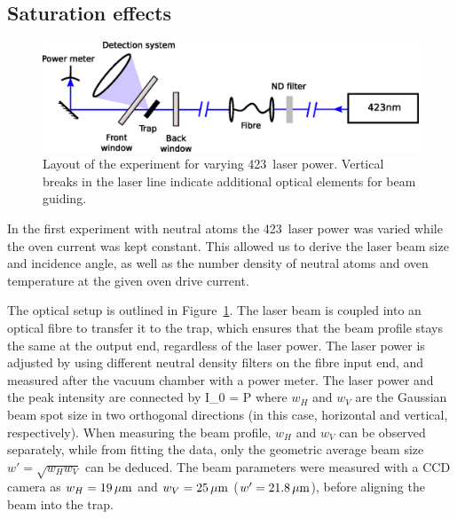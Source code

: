 \subsection{Saturation effects}
\label{subsec:saturationfluo}


\begin{figure}[t]
\centering
\includegraphics[angle=0,width=14cm]{chapter5/423layout_v3}
\caption[Layout of the neutral fluorescence experiments]{Layout of the experiment for varying 423\nm\, laser power. Vertical breaks in the laser line indicate additional optical elements for beam guiding.}
\label{fig:423neutralexpt}
\end{figure} 

In the first experiment with neutral \CaI{} atoms the 423\nm\, laser power was varied while the oven current was kept constant. This allowed us to derive the laser beam size and incidence angle, as well as the number density of neutral atoms and oven temperature at the given oven drive current.

The optical setup is outlined in Figure~\ref{fig:423neutralexpt}. The laser beam is coupled into an optical fibre to transfer it to the trap, which ensures that the beam profile stays the same at the output end, regardless of the laser power. The laser power is adjusted by using different neutral density filters on the fibre input end, and measured after the vacuum chamber with a power meter. The laser power and the peak intensity are connected by
\be
I_0 = P
\ee
where $w_H$ and $w_V$ are the Gaussian beam spot size in two orthogonal directions (in this case, horizontal and vertical, respectively). When measuring the beam profile, $w_H$ and $w_V$ can be observed separately, while from fitting the data, only the geometric average beam size $w' = \sqrt{w_H w_V}$ can be deduced. The beam parameters were measured with a CCD camera as $ w_H = 19\,\mbox{$\mu$m} $ and $ w_V = 25\,\mbox{$\mu$m} $ ($w' = 21.8\,\mbox{$\mu$m}$), before aligning the beam into the trap.



